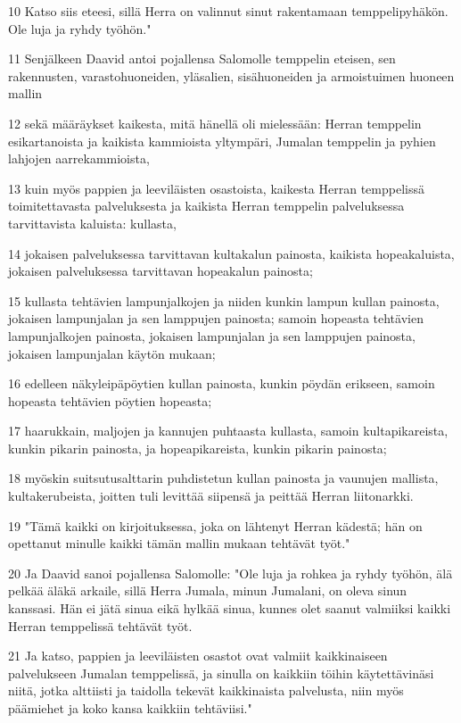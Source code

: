 \par 10 Katso siis eteesi, sillä Herra on valinnut sinut rakentamaan temppelipyhäkön. Ole luja ja ryhdy työhön."
\par 11 Senjälkeen Daavid antoi pojallensa Salomolle temppelin eteisen, sen rakennusten, varastohuoneiden, yläsalien, sisähuoneiden ja armoistuimen huoneen mallin
\par 12 sekä määräykset kaikesta, mitä hänellä oli mielessään: Herran temppelin esikartanoista ja kaikista kammioista yltympäri, Jumalan temppelin ja pyhien lahjojen aarrekammioista,
\par 13 kuin myös pappien ja leeviläisten osastoista, kaikesta Herran temppelissä toimitettavasta palveluksesta ja kaikista Herran temppelin palveluksessa tarvittavista kaluista: kullasta,
\par 14 jokaisen palveluksessa tarvittavan kultakalun painosta, kaikista hopeakaluista, jokaisen palveluksessa tarvittavan hopeakalun painosta;
\par 15 kullasta tehtävien lampunjalkojen ja niiden kunkin lampun kullan painosta, jokaisen lampunjalan ja sen lamppujen painosta; samoin hopeasta tehtävien lampunjalkojen painosta, jokaisen lampunjalan ja sen lamppujen painosta, jokaisen lampunjalan käytön mukaan;
\par 16 edelleen näkyleipäpöytien kullan painosta, kunkin pöydän erikseen, samoin hopeasta tehtävien pöytien hopeasta;
\par 17 haarukkain, maljojen ja kannujen puhtaasta kullasta, samoin kultapikareista, kunkin pikarin painosta, ja hopeapikareista, kunkin pikarin painosta;
\par 18 myöskin suitsutusalttarin puhdistetun kullan painosta ja vaunujen mallista, kultakerubeista, joitten tuli levittää siipensä ja peittää Herran liitonarkki.
\par 19 "Tämä kaikki on kirjoituksessa, joka on lähtenyt Herran kädestä; hän on opettanut minulle kaikki tämän mallin mukaan tehtävät työt."
\par 20 Ja Daavid sanoi pojallensa Salomolle: "Ole luja ja rohkea ja ryhdy työhön, älä pelkää äläkä arkaile, sillä Herra Jumala, minun Jumalani, on oleva sinun kanssasi. Hän ei jätä sinua eikä hylkää sinua, kunnes olet saanut valmiiksi kaikki Herran temppelissä tehtävät työt.
\par 21 Ja katso, pappien ja leeviläisten osastot ovat valmiit kaikkinaiseen palvelukseen Jumalan temppelissä, ja sinulla on kaikkiin töihin käytettävinäsi niitä, jotka alttiisti ja taidolla tekevät kaikkinaista palvelusta, niin myös päämiehet ja koko kansa kaikkiin tehtäviisi."

